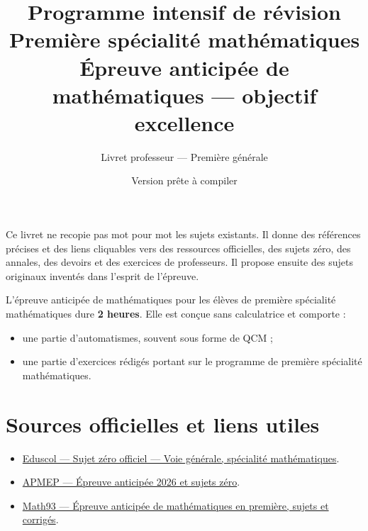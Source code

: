 \documentclass[11pt,a4paper]{article}
\title{
  \Huge\textbf{Programme intensif de révision}\\[2mm]
  \Large Première spécialité mathématiques\\[1mm]
  \large Épreuve anticipée de mathématiques — objectif excellence
}
\author{Livret professeur — Première générale}
\date{Version prête à compiler}
\begin{document}
\maketitle

\begin{alerte}
Ce livret ne recopie pas mot pour mot les sujets existants. Il donne des références précises et des liens cliquables vers des ressources officielles, des sujets zéro, des annales, des devoirs et des exercices de professeurs. Il propose ensuite des sujets originaux inventés dans l'esprit de l'épreuve.
\end{alerte}

\begin{alerte}
L'épreuve anticipée de mathématiques pour les élèves de première spécialité mathématiques dure \textbf{2 heures}.  
Elle est conçue sans calculatrice et comporte :
\begin{itemize}
  \item une partie d'automatismes, souvent sous forme de QCM ;
  \item une partie d'exercices rédigés portant sur le programme de première spécialité mathématiques.
\end{itemize}
\end{alerte}

\tableofcontents
\newpage

\section{Sources officielles et liens utiles}

\begin{sujetofficiel}
\begin{itemize}
  \item \href{https://eduscol.education.fr/sites/default/files/document/sujet-specialite-1pdf-112050.pdf}{Eduscol — Sujet zéro officiel — Voie générale, spécialité mathématiques}.
  \item \href{https://www.apmep.fr/Epreuve-anticipee-2025}{APMEP — Épreuve anticipée 2026 et sujets zéro}.
  \item \href{https://math93.com/index.php?Itemid=1608&catid=164%3Aannales-du-bac-premiere-maths-epreuve-anticipee-de-mathematiquesde-premiere&id=1192%3Abac-2026-epreuve-anticipee-de-mathematiques-en-premiere-sujets-et-corriges-math93&option=com_content&view=article}{Math93 — Épreuve anticipée de mathématiques en première, sujets et corrigés}.
\end{itemize}
\end{sujetofficiel}
\end{document}
